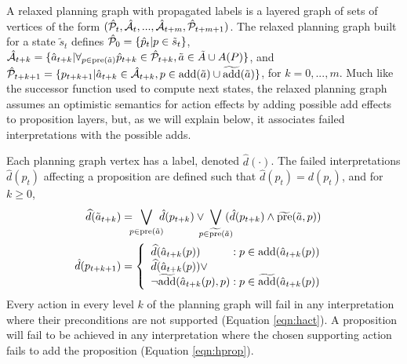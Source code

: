 \documentclass[letterpaper]{article}
\begin{document}
A relaxed planning graph with propagated labels is a layered
graph of sets of vertices of the form $(\hat{\cal P}_t, \hat{\cal A}_t, ..., \hat{\cal
A}_{t+m}, \hat{\cal P}_{t+m+1})$. The relaxed planning graph built for a state $\tilde{s}_t$ defines $\hat{\cal P}_0 = \{\hat{p}_t | p \in \tilde{s}_t\}$, $\hat{\cal A}_{t+k} = \{ \hat{a}_{t+k} | \forall_{p \in \text{pre}(\tilde{a})} \hat{p}_{t+k} \in \hat{\cal P}_{t+k}, \tilde{a} \in \tilde{A} \cup A(P)\}$, and $\hat{\cal P}_{t+k+1} = \{p_{t+k+1} | \hat{a}_{t+k} \in \hat{\cal A}_{t+k}, p \in \text{add}(\tilde{a}) \cup \widetilde{\text{add}}(\tilde{a})\}$, for $k = 0, ..., m$.  Much like the successor function used to compute next states, the relaxed planning graph assumes an optimistic semantics for action effects by adding possible add effects to proposition layers, but, as we will explain below, it associates failed interpretations with the possible adds. 

 Each planning graph vertex has a label, denoted $\hat{d}(\cdot)$.  The failed interpretations $\hat{d}(p_t) $ affecting a proposition are defined such that $\hat{d}(p_t) = d(p_t)$, and for $k \geq 0$, 
\begin{align}
\widehat{d}(\tilde{a}_{t+k}) &= \hspace*{-.2cm} 
\bigvee\limits_{p \in \text{pre}(\tilde{a}) } \hspace*{-.2cm}   \hat{d}(p_{t+k}) \vee \hspace*{-.25cm} 
\bigvee\limits_{p \in \widetilde{\text{pre}}(\tilde{a})} \hspace*{-.25cm}  (\hat{d}(p_{t+k})  \wedge  \widetilde{\text{pre}}(\tilde{a}, p) )\label{eqn:hact}\\
 \hspace*{-.6cm} \hat{d}(p_{t+k+1}) &= 
\left\{\begin{array}{l@{\;}l@{\;}r}
\widehat{d}(\hat{a}_{t+k}(p)) & : p \in \text{add}(\hat{a}_{t+k}(p))\\
\widehat{d}(\hat{a}_{t+k}(p)) \vee \\
\neg\widetilde{\text{add}}(\hat{a}_{t+k}(p), p) & : p \in \widetilde{\text{add}}(\hat{a}_{t+k}(p))\end{array}\right. \hspace*{-.1cm}\label{eqn:hprop}
\end{align}
\noindent 
Every action in every level $k$ of the planning graph will fail in any interpretation where their preconditions are not supported (Equation \ref{eqn:hact}).  A proposition will fail to be achieved in any interpretation where the chosen supporting action fails to add the proposition (Equation \ref{eqn:hprop}).
\end{document}
